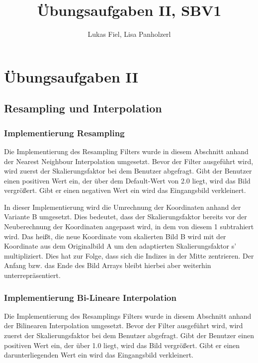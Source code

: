 \documentclass[12pt,german]{article}
\begin{document}
\title{Übungsaufgaben II, SBV1 }
\author{Lukas Fiel, Lisa Panholzerl}
\maketitle


\newpage
\section{Übungsaufgaben II}
\subsection{Resampling und Interpolation}
\subsubsection{Implementierung Resampling}
Die Implementierung des Resampling Filters wurde in diesem Abschnitt anhand der Nearest Neighbour Interpolation umgesetzt. Bevor der Filter ausgeführt wird, wird zuerst der Skalierungsfaktor bei dem Benutzer abgefragt. Gibt der Benutzer einen positiven Wert ein, der über dem Default-Wert von 2.0 liegt, wird das Bild vergrößert. Gibt er einen negativen Wert ein wird das Eingangsbild verkleinert.

In dieser Implementierung wird die Umrechnung der Koordinaten anhand der Variante B umgesetzt. Dies bedeutet, dass der Skalierungsfaktor bereits vor der Neuberechnung der Koordinaten angepasst wird, in dem von diesem 1 subtrahiert wird. Das heißt, die neue Koordinate vom skalierten Bild B wird mit der Koordinate aus dem Originalbild A um den adaptierten Skalierungsfaktor s' multipliziert. Dies hat zur Folge, dass sich die Indizes in der Mitte zentrieren. Der Anfang bzw. das Ende des Bild Arrays bleibt hierbei aber weiterhin unterrepräsentiert.\\



\subsubsection{Implementierung Bi-Lineare Interpolation}
Die Implementierung des Resamplings Filters wurde in diesem Abschnitt anhand der Bilinearen Interpolation umgesetzt. Bevor der Filter ausgeführt wird, wird zuerst der Skalierungsfaktor bei dem Benutzer abgefragt. Gibt der Benutzer einen positiven Wert ein, der über 1.0 liegt, wird das Bild vergrößert. Gibt er einen darunterliegenden Wert ein wird das Eingangsbild verkleinert.
\end{document}

